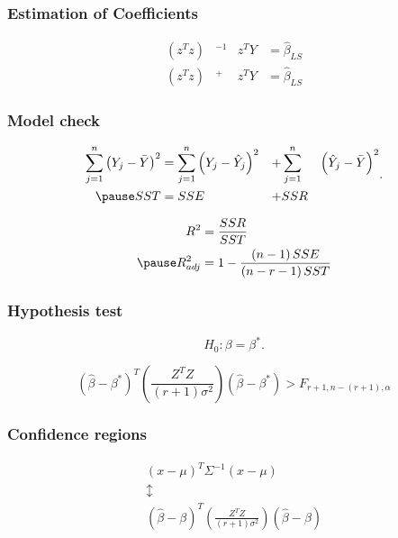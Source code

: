 \documentclass[aspectratio=169,10pt,t]{beamer}
\begin{document}
\begin{frame}[t]
	\frametitle{Estimation of Coefficients}
	\[
		\begin{aligned}
			\left( z^{T} z  \right)& ^{-1} &z^{T} Y &= \hat{\beta}_{LS}\\
			\left( z^{T} z  \right)& ^{+} &z^{T} Y &= \hat{\beta}_{LS}
		\end{aligned}
	\] 
\end{frame}

\begin{frame}[t]
	\frametitle{Model check}
	
	\[
		\begin{aligned}
			\sum^{n}_{j=1} 
			\left( Y_j -\bar{Y}   \right)^{2}
			&=
			\sum^{n}_{j=1}  \left( Y_j -\hat{Y}_{j}  \right) ^{2}
			&+
			&\sum^{n}_{j=1}&  \left( \hat{Y}_{j} - \bar{Y}  \right) ^{2} \\
			\pause
			SST &= SSE &+ &SSR
		\end{aligned}
	.\] 

	\[
	 \begin{aligned}
		 R^{2} &= \frac{SSR}{SST} \\
		 \pause
		 R^{2}_{adj} & = 1 - \frac{ \left( n-1 \right) SSE}{ \left( n-r-1 \right) SST} 
	 \end{aligned}
	\] 
\end{frame}

\begin{frame}[t]
	\frametitle{Hypothesis test}

	\[
	H_0 : \beta = \beta^{*}
	.\] 

	\[
		\left( \hat{\beta} - \beta^{*}\right) ^{T}
		\left( \frac{Z^{T}Z}{ \left( r+1 \right) \sigma^{2}}   \right) 
		\left( \hat{\beta}  -\beta^{*}\right) 
		>
		F_{r+1,n- \left( r+1 \right) , \alpha}
	\] 

	
\end{frame}

\begin{frame}[t]
	\frametitle{Confidence regions}

	\[
	\begin{gathered}
		\left( x- \mu  \right) ^{T} \Sigma^{-1}  \left( x- \mu \right) \\
													 \updownarrow\\
													 \left( \hat{\beta} - \beta \right) ^{T}
													 \left( \frac{Z^{T}Z}{ \left( r+1 \right) \sigma^{2}}   \right) 
													 \left( \hat{\beta}  -\beta\right) 
	\end{gathered}
	\] 

\end{frame}
\end{document}
